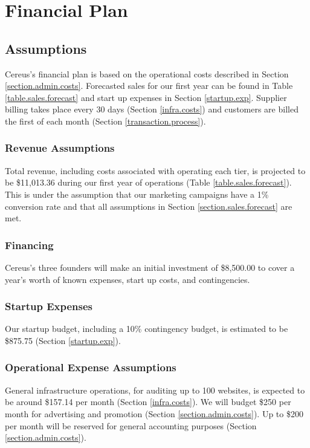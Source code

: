 {\let\cleardoublepage\relax \chapter{Financial Plan}}

\section{Assumptions}

Cereus's financial plan is based on the operational costs described in Section \ref{section.admin.costs}. Forecasted sales for our first year can be found in Table \ref{table.sales.forecast} and start up expenses in Section \ref{startup.exp}. Supplier billing takes place every 30 days (Section \ref{infra.costs}) and customers are billed the first of each month (Section \ref{transaction.process}).

\subsection{Revenue Assumptions}

Total revenue, including costs associated with operating each tier, is projected to be \$11,013.36 during our first year of operations (Table \ref{table.sales.forecast}). This is under the assumption that our marketing campaigns have a 1\% conversion rate and that all assumptions in Section \ref{section.sales.forecast} are met.

\subsection{Financing}

Cereus's three founders will make an initial investment of \$8,500.00 to cover a year's worth of known expenses, start up costs, and contingencies.

\subsection{Startup Expenses}

Our startup budget, including a 10\% contingency budget, is estimated to be \$875.75 (Section \ref{startup.exp}).

\subsection{Operational Expense Assumptions}

General infrastructure operations, for auditing up to 100 websites, is expected to be around \$157.14 per month (Section \ref{infra.costs}). We will budget \$250 per month for advertising and promotion (Section \ref{section.admin.costs}). Up to \$200 per month will be reserved for general accounting purposes (Section \ref{section.admin.costs}).


